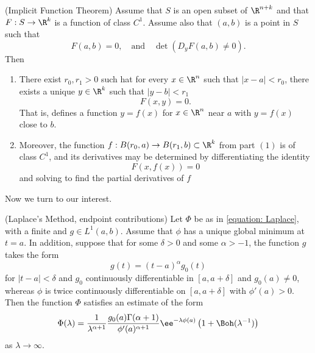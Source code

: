 \begin{teorema}
	(Implicit Function Theorem) Assume that $S$ is an open subset of $\R^{n+k}$ and that $F: S \rightarrow \R^k$ is a function of class $C^1$. Assume also that $(a, b)$ is a point in $S$ such that
	\begin{equation}
		F(a, b) = 0, \quad \text{and} \quad \det(D_yF(a,b)\neq 0).
	\end{equation}
	Then
	\begin{enumerate}
		\item There exist $r_0, r_1 > 0$ such hat for every $x \in \R^n$ such that $|x-a| < r_0$, there exists a unique $y \in \R^k$ such that $|y - b| < r_1$
		\begin{equation}
			F(x,y) = 0.
		\end{equation}
		That is, defines a function $y = f(x)$ for $x \in \R^n$ near $a$ with $y = f(x)$ close to $b$.
		\item Moreover, the function $f: B(r_0, a) \rightarrow B(r_1, b) \subset \R^k$ from part $(1)$ is of class $C^1$, and its derivatives may be determined by differentiating the identity 
		\begin{equation}
			F(x, f(x)) = 0
		\end{equation}
		and solving to find the partial derivatives of $f$
	\end{enumerate}
\end{teorema}

Now we turn to our interest.

\begin{teorema}
	(Laplace's Method, endpoint contributions) Let $\Phi$ be as in \ref{equation: Laplace}, with a finite and $g \in L^1(a,b)$. Assume that $\phi$ has a unique global minimum at $t=a$. In addition, suppose that for some $\delta > 0$ and some $\alpha > -1$, the function $g$ takes the form
	\begin{equation}
		g(t) = (t-a)^{\alpha} g_0(t)
	\end{equation}
	for $|t-a| < \delta$ and $g_0$ continuously differentiable in $[a, a+\delta]$ and $g_0(a) \neq 0$, whereas $\phi$ is twice continuously differentiable on $[a, a+\delta]$ with $\phi'(a) > 0$. Then the function $\Phi$ satisfies an estimate of the form
	\begin{equation}
		\Phi(\lambda) = \frac{1}{\lambda^{\alpha + 1}} \frac{g_0(a) \Gamma(\alpha + 1)}{\phi'(a)^{\alpha + 1}} \ee^{-\lambda \phi(a)} \left(1+\Boh(\lambda^{-1})\right)
	\end{equation}
	as $\lambda \rightarrow \infty$.
\end{teorema}

